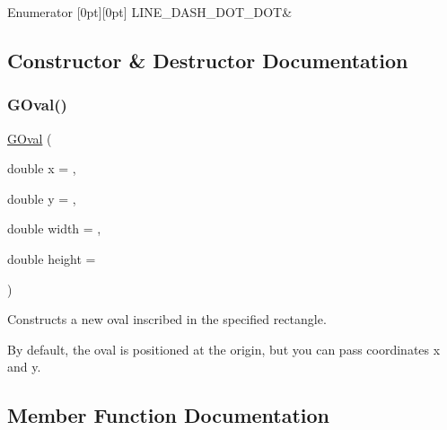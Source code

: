 \begin{DoxyEnumFields}{Enumerator}
[0pt][0pt]{}\mbox{\label{classsgl_1_1GObject_a86e0f5648542856159bb40775c854aa7aabf4053a73eafa7ba2b7e6d664c74c1d}} 
L\+I\+N\+E\+\_\+\+D\+A\+S\+H\+\_\+\+D\+O\+T\+\_\+\+D\+OT&\\
\hline

\end{DoxyEnumFields}


\subsection{Constructor \& Destructor Documentation}
\mbox{\label{classsgl_1_1GOval_a0dc1da9139884a189b3fd0882c638bfc}} 
\subsubsection{\texorpdfstring{G\+Oval()}{GOval()}}
{\footnotesize\ttfamily \mbox{\hyperlink{classsgl_1_1GOval}{G\+Oval}} (\begin{DoxyParamCaption}\item[{double}]{x = {},  }\item[{double}]{y = {},  }\item[{double}]{width = {},  }\item[{double}]{height = {} }\end{DoxyParamCaption})}



Constructs a new oval inscribed in the specified rectangle. 

By default, the oval is positioned at the origin, but you can pass coordinates {\ttfamily x} and {\ttfamily y}. 

\subsection{Member Function Documentation}
\mbox{\label{classsgl_1_1GObject_a1dbc9dafaae51958112dbe1267a1f547}} 
